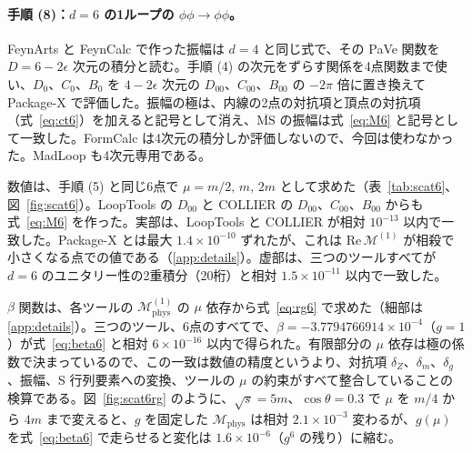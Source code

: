 \documentclass[a4paper,10pt]{ltjsarticle}
\begin{document}
\paragraph{手順 (8)：$d=6$ の1ループの $\phi\phi\to\phi\phi$。}FeynArts と FeynCalc で作った振幅は $d=4$ と同じ式で、その PaVe 関数を $D=6-2\epsilon$ 次元の積分と読む。手順 (4) の次元をずらす関係を4点関数まで使い、$D_0$、$C_0$、$B_0$ を $4-2\epsilon$ 次元の $D_{00}$、$C_{00}$、$B_{00}$ の $-2\pi$ 倍に置き換えて Package-X で評価した。振幅の極は、内線の2点の対抗項と頂点の対抗項（式~\eqref{eq:ct6}）を加えると記号として消え、$\overline{\mathrm{MS}}$ の振幅は式~\eqref{eq:M6} と記号として一致した。FormCalc は4次元の積分しか評価しないので、今回は使わなかった。MadLoop も4次元専用である。

数値は、手順 (5) と同じ6点で $\mu=m/2,\,m,\,2m$ として求めた（表~\ref{tab:scat6}、図~\ref{fig:scat6}）。LoopTools の $D_{00}$ と COLLIER の $D_{00}$、$C_{00}$、$B_{00}$ からも式~\eqref{eq:M6} を作った。実部は、LoopTools と COLLIER が相対 $10^{-13}$ 以内で一致した。Package-X とは最大 $1.4\times10^{-10}$ ずれたが、これは $\mathrm{Re}\,\mathcal{M}^{(1)}$ が相殺で小さくなる点での値である（\ref{app:details}）。虚部は、三つのツールすべてが $d=6$ のユニタリー性の2重積分（20桁）と相対 $1.5\times10^{-11}$ 以内で一致した。

$\beta$ 関数は、各ツールの $\mathcal{M}^{(1)}_{\mathrm{phys}}$ の $\mu$ 依存から式~\eqref{eq:rg6} で求めた（細部は\ref{app:details}）。三つのツール、6点のすべてで、$\beta=-3.7794766914\times10^{-4}$（$g=1$）が式~\eqref{eq:beta6} と相対 $6\times10^{-16}$ 以内で得られた。有限部分の $\mu$ 依存は極の係数で決まっているので、この一致は数値の精度というより、対抗項 $\delta_Z$、$\delta_m$、$\delta_g$、振幅、S 行列要素への変換、ツールの $\mu$ の約束がすべて整合していることの検算である。図~\ref{fig:scat6rg} のように、$\sqrt s=5m$、$\cos\theta=0.3$ で $\mu$ を $m/4$ から $4m$ まで変えると、$g$ を固定した $\mathcal{M}_{\mathrm{phys}}$ は相対 $2.1\times10^{-3}$ 変わるが、$g(\mu)$ を式~\eqref{eq:beta6} で走らせると変化は $1.6\times10^{-6}$（$g^6$ の残り）に縮む。
\end{document}
